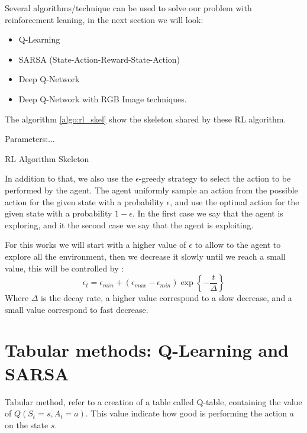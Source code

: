 Several algorithms/technique can be used  to solve our problem with reinforcement leaning, in the next section we will look:
\begin{itemize}
	\item Q-Learning
	\item SARSA (State-Action-Reward-State-Action)
	\item Deep Q-Network
	\item Deep Q-Network with RGB Image techniques.
\end{itemize}
The algorithm \ref{algo:rl_skel} show the skeleton shared by these RL algorithm.
\begin{algorithm}
Parameters:$\ldots$\\
\caption{RL Algorithm Skeleton}
\label{algo:rl_skel}
\end{algorithm}
In addition to that, we also use the $\epsilon$-greedy strategy to select the action to be performed by the agent. The agent uniformly sample an action from the possible action for the given state with a probability $\epsilon$, and use the optimal action for the given state with a probability $1-\epsilon$. In the first case we say that the agent is exploring, and it the second case we say that the agent is exploiting.


For this works we will start with a higher value of $\epsilon$ to allow to the agent to explore all the environment, then we decrease it slowly until we reach a small value, this will be controlled by :
\begin{equation}
\epsilon_t = \epsilon_{min} + \left(\epsilon_{max} - \epsilon_{min}\right) \exp\left\{-\frac{t}{\Delta}\right\}
\end{equation}
Where $\Delta$ is the decay rate, a higher value correspond to a slow decrease, and a small value correspond to fast decrease.
\section{Tabular methods: Q-Learning and SARSA}
Tabular method, refer to a creation of a table called Q-table, containing the value of $Q(S_t=s,A_t=a)$. This value indicate how good is performing the action $a$ on the state $s$.

